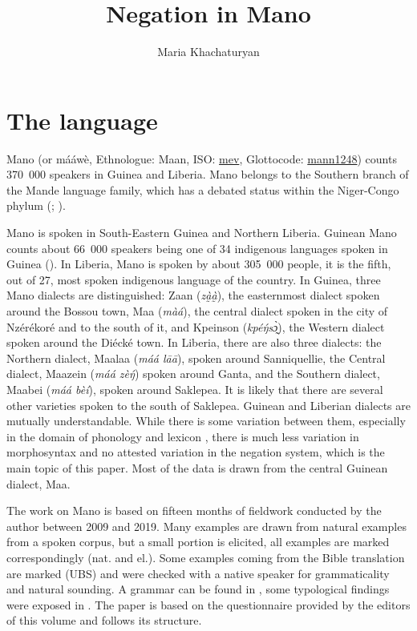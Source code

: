\documentclass[output=paper,colorlinks,citecolor=brown]{langscibook}
\author{Maria Khachaturyan\affiliation{University of Helsinki, Helsinki Collegium for Advanced Studies}}
\title{Negation in Mano}
\begin{document}
\maketitle 

\section{The language}\label{sec:mano:1}

Mano (or mááwè, Ethnologue: Maan, ISO: \href{https://iso639-3.sil.org/code/mev}{mev}, Glottocode: \href{https://glottolog.org/resource/languoid/id/mann1248}{mann1248})  counts 370~000 speakers in Guinea and Liberia. Mano belongs to the Southern branch of the Mande language family, which has a debated status within the Niger-Congo phylum (\citealt{Vydrine2016}; \citealt{DimmendaalStorch2016}). 

Mano is spoken in South-Eastern Guinea and Northern Liberia. Guinean Mano counts about 66~000 speakers being one of 34 indigenous languages spoken in Guinea (\citealt{BahBangoura2017}). In Liberia, Mano is spoken by about 305~000 people, it is the fifth, out of 27, most spoken indigenous language of the country. In Guinea, three Mano dialects are distinguished: Zaan (\textit{zà̰à̰}), the easternmost dialect spoken around the Bossou town, Maa (\textit{màá}), the central dialect spoken in the city of Nzérékoré and to the south of it, and Kpeinson (\textit{kpéŋ́sɔ̰̀}), the Western dialect spoken around the Diécké town. In Liberia, there are also three dialects: the Northern dialect, Maalaa (\textit{máá lāā}), spoken around Sanniquellie, the Central dialect, Maazein (\textit{máá zè\'{ŋ}}) spoken around Ganta, and the Southern dialect, Maabei (\textit{máá bèí}), spoken around Saklepea. It is likely that there are several other varieties spoken to the south of Saklepea. Guinean and Liberian dialects are mutually understandable. While there is some variation between them, especially in the domain of phonology and lexicon \citep{Khachaturyan2018}, there is much less variation in morphosyntax and no attested variation in the negation system, which is the main topic of this paper. Most of the data is drawn from the central Guinean dialect, Maa.

The work on Mano is based on fifteen months of fieldwork conducted by the author between 2009 and 2019. Many examples are drawn from natural examples from a spoken corpus, but a small portion is elicited, all examples are marked correspondingly (nat. and el.). 
Some examples coming from the Bible translation \citep{UBS1978} are marked (UBS) and were checked with a native speaker for grammaticality and natural sounding. A grammar can be found in \citet{Khachaturyan2015}, some typological findings were exposed in \citet{Khachaturyan2014grammaire,Khachaturyan2020}. The paper is based on the questionnaire
provided by the editors of this volume  and follows its structure.
\end{document}
